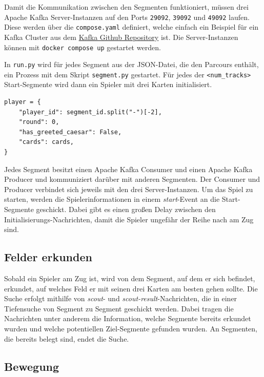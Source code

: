 \documentclass[]{article}
\begin{document}
Damit die Kommunikation zwischen den Segmenten funktioniert, müssen drei Apache Kafka Server-Instanzen auf den Ports \texttt{29092}, \texttt{39092} und \texttt{49092} laufen. Diese werden über die \texttt{compose.yaml} definiert, welche einfach ein Beispiel für ein Kafka Cluster aus dem \href{https://github.com/apache/kafka/blob/trunk/docker/examples/docker-compose-files/cluster/combined/plaintext/docker-compose.yml}{Kafka Github Repository} ist. Die Server-Instanzen können mit \texttt{docker compose up} gestartet werden.\par
In \texttt{run.py} wird für jedes Segment aus der JSON-Datei, die den Parcours enthält, ein Prozess mit dem Skript \texttt{segment.py} gestartet. Für jedes der \texttt{<num\_tracks>} Start-Segmente wird dann ein Spieler mit drei Karten initialisiert.
\begin{verbatim}
player = {
    "player_id": segment_id.split("-")[-2],
    "round": 0,
    "has_greeted_caesar": False,
    "cards": cards,
}
\end{verbatim}
Jedes Segment besitzt einen Apache Kafka Consumer und einen Apache Kafka Producer und kommuniziert darüber mit anderen Segmenten. Der Consumer und Producer verbindet sich jeweils mit den drei Server-Instanzen. Um das Spiel zu starten, werden die Spielerinformationen in einem \emph{start}-Event an die Start-Segmente geschickt. Dabei gibt es einen großen Delay zwischen den Initialisierungs-Nachrichten, damit die Spieler ungefähr der Reihe nach am Zug sind.

\subsection{Felder erkunden}
\label{subsec:scouting}

Sobald ein Spieler am Zug ist, wird von dem Segment, auf dem er sich befindet, erkundet, auf welches Feld er mit seinen drei Karten am besten gehen sollte. Die Suche erfolgt mithilfe von \emph{scout}- und \emph{scout-result}-Nachrichten, die in einer Tiefensuche von Segment zu Segment geschickt werden. Dabei tragen die Nachrichten unter anderem die Information, welche Segmente bereits erkundet wurden und welche potentiellen Ziel-Segmente gefunden wurden. An Segmenten, die bereits belegt sind, endet die Suche.

\subsection{Bewegung}
\label{subsec:move}
\end{document}
